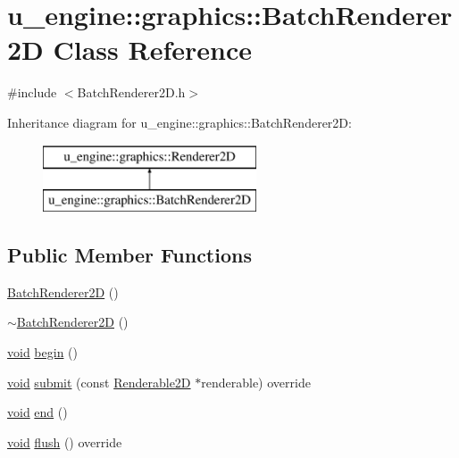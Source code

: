\hypertarget{classu__engine_1_1graphics_1_1_batch_renderer2_d}{}\section{u\+\_\+engine\+:\+:graphics\+:\+:Batch\+Renderer2\+D Class Reference}
\label{classu__engine_1_1graphics_1_1_batch_renderer2_d}


{\ttfamily \#include $<$Batch\+Renderer2\+D.\+h$>$}

Inheritance diagram for u\+\_\+engine\+:\+:graphics\+:\+:Batch\+Renderer2\+D\+:\begin{figure}[H]
\begin{center}
\leavevmode
\includegraphics[height=2.000000cm]{classu__engine_1_1graphics_1_1_batch_renderer2_d}
\end{center}
\end{figure}
\subsection*{Public Member Functions}
\begin{DoxyCompactItemize}
\item 
\hyperlink{classu__engine_1_1graphics_1_1_batch_renderer2_d_a8cfb6ce4b560b3a1dede2b4ff0dee650}{Batch\+Renderer2\+D} ()
\item 
\hyperlink{classu__engine_1_1graphics_1_1_batch_renderer2_d_a0e49da8a08355e100e86ee3ef0f888cc}{$\sim$\+Batch\+Renderer2\+D} ()
\item 
\hyperlink{wglew_8h_aeea6e3dfae3acf232096f57d2d57f084}{void} \hyperlink{classu__engine_1_1graphics_1_1_batch_renderer2_d_aa00e0dde727955d2911530fb7d0a53df}{begin} ()
\item 
\hyperlink{wglew_8h_aeea6e3dfae3acf232096f57d2d57f084}{void} \hyperlink{classu__engine_1_1graphics_1_1_batch_renderer2_d_a74a8a92bdf3170a3adbbeebbe9ef8a06}{submit} (const \hyperlink{classu__engine_1_1graphics_1_1_renderable2_d}{Renderable2\+D} $\ast$renderable) override
\item 
\hyperlink{wglew_8h_aeea6e3dfae3acf232096f57d2d57f084}{void} \hyperlink{classu__engine_1_1graphics_1_1_batch_renderer2_d_a587a1e9091632c90b1706ac5a779d3d4}{end} ()
\item 
\hyperlink{wglew_8h_aeea6e3dfae3acf232096f57d2d57f084}{void} \hyperlink{classu__engine_1_1graphics_1_1_batch_renderer2_d_a6f95ef0c0a94e1df2b94efa662babd15}{flush} () override
\end{DoxyCompactItemize}


